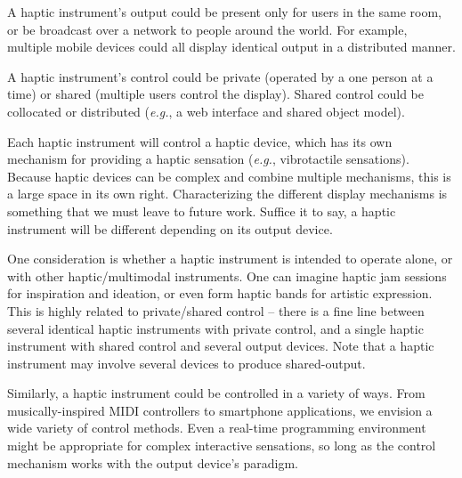 	 A haptic instrument's output could be present only for users in the same room, or be broadcast over a network to people around the world. For example, multiple mobile devices could all display identical output in a distributed manner.

	 A haptic instrument's control %
 could be private (operated by a one person at a time) or shared (multiple users control the display). 
Shared control could be collocated or distributed (\emph{e.g.}, a web interface and shared object model).
	
	 Each haptic instrument will control a haptic device, which has its own mechanism for providing a haptic sensation (\emph{e.g.}, vibrotactile sensations). Because haptic devices can be complex and combine multiple mechanisms, this is a large space in its own right. Characterizing the different display mechanisms is something that we must leave to future work. Suffice it to say, a haptic instrument will be different depending on its output device.

	One consideration is whether a haptic instrument is intended to operate alone, or with other haptic/multimodal instruments.
	One can imagine haptic jam sessions for inspiration and ideation, or even form haptic bands for artistic expression.
	This is highly related to private/shared control -- there is a fine line between several identical haptic instruments with private control, and a single haptic instrument with shared control and several output devices. Note that a haptic instrument may involve several devices to produce shared-output.

	 Similarly, a haptic instrument could be controlled in a variety of ways.
	From musically-inspired MIDI controllers to smartphone applications, we envision a wide variety of control methods.
	Even a real-time programming environment might be appropriate for complex interactive sensations,
	so long as the control mechanism works with the output device's paradigm.

